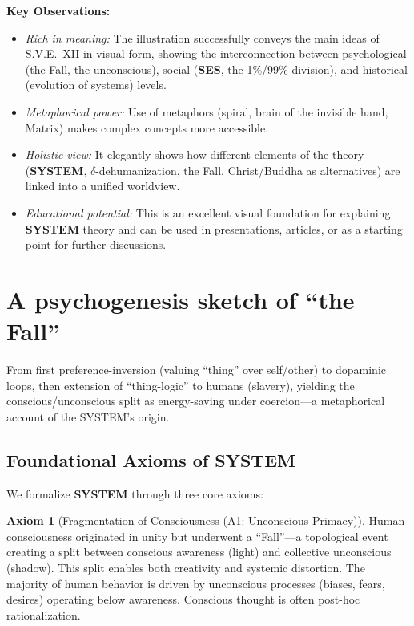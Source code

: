 \documentclass[11pt,a4paper]{article}
\newcommand{\SYSTEM}{\textbf{SYSTEM}}
\newcommand{\SES}{\textbf{SES}}
\newcommand{\deltaDehum}{$\delta$-dehumanization}
\theoremstyle{definition}
\newtheorem{axiom}{Axiom}[section]
\theoremstyle{remark}
\begin{document}
\textbf{Key Observations:}
\begin{itemize}
    \item \textit{Rich in meaning:} The illustration successfully conveys the main ideas of S.V.E.~XII in visual form, showing the interconnection between psychological (the Fall, the unconscious), social (\SES{}, the 1\%/99\% division), and historical (evolution of systems) levels.
    \item \textit{Metaphorical power:} Use of metaphors (spiral, brain of the invisible hand, Matrix) makes complex concepts more accessible.
    \item \textit{Holistic view:} It elegantly shows how different elements of the theory (\SYSTEM{}, \deltaDehum{}, the Fall, Christ/Buddha as alternatives) are linked into a unified worldview.
    \item \textit{Educational potential:} This is an excellent visual foundation for explaining \SYSTEM{} theory and can be used in presentations, articles, or as a starting point for further discussions.
\end{itemize}

\section{A psychogenesis sketch of ``the Fall''}
\label{app:fall}
From first preference-inversion (valuing ``thing'' over self/other) to dopaminic loops, then extension of ``thing-logic'' to humans (slavery), yielding the conscious/unconscious split as energy-saving under coercion---a metaphorical account of the SYSTEM’s origin. %


\subsection{Foundational Axioms of \SYSTEM{}}

We formalize \SYSTEM{} through three core axioms:

\begin{axiom}[Fragmentation of Consciousness (A1: Unconscious Primacy)]
\label{ax:fragmentation}
Human consciousness originated in unity but underwent a ``Fall''---a topological event creating a split between conscious awareness (light) and collective unconscious (shadow). This split enables both creativity and systemic distortion. The majority of human behavior is driven by unconscious processes (biases, fears, desires) operating below awareness. Conscious thought is often post-hoc rationalization.
\end{axiom}
\end{document}
